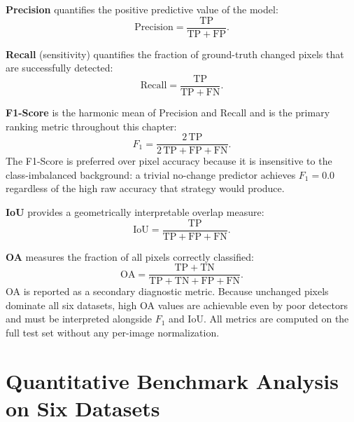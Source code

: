 \noindent\textbf{Precision} quantifies the positive predictive value of the model:
\begin{equation}
\mathrm{Precision} = \frac{\mathrm{TP}}{\mathrm{TP} + \mathrm{FP}}.
\label{eq:exp_precision}
\end{equation}

\noindent\textbf{Recall} (sensitivity) quantifies the fraction of ground-truth
changed pixels that are successfully detected:
\begin{equation}
\mathrm{Recall} = \frac{\mathrm{TP}}{\mathrm{TP} + \mathrm{FN}}.
\label{eq:exp_recall}
\end{equation}

\noindent\textbf{F1-Score} is the harmonic mean of Precision and Recall and is
the primary ranking metric throughout this chapter:
\begin{equation}
F_1 = \frac{2\,\mathrm{TP}}{2\,\mathrm{TP} + \mathrm{FP} + \mathrm{FN}}.
\label{eq:exp_f1}
\end{equation}
The F1-Score is preferred over pixel accuracy because it is insensitive to the
class-imbalanced background: a trivial no-change predictor achieves $F_1 = 0.0$
regardless of the high raw accuracy that strategy would produce.

\noindent\textbf{\ac{IoU}} provides a geometrically interpretable overlap measure:
\begin{equation}
\mathrm{IoU} = \frac{\mathrm{TP}}{\mathrm{TP} + \mathrm{FP} + \mathrm{FN}}.
\label{eq:exp_iou}
\end{equation}

\noindent\textbf{\ac{OA}} measures the fraction of all pixels correctly classified:
\begin{equation}
\mathrm{OA} = \frac{\mathrm{TP} + \mathrm{TN}}
               {\mathrm{TP} + \mathrm{TN} + \mathrm{FP} + \mathrm{FN}}.
\label{eq:exp_oa}
\end{equation}
\ac{OA} is reported as a secondary diagnostic metric. Because unchanged pixels
dominate all six datasets, high \ac{OA} values are achievable even by poor
detectors and must be interpreted alongside $F_1$ and \ac{IoU}. All metrics are
computed on the full test set without any per-image normalization.


\section{Quantitative Benchmark Analysis on Six Datasets}
\label{sec:exp-quantitative}

